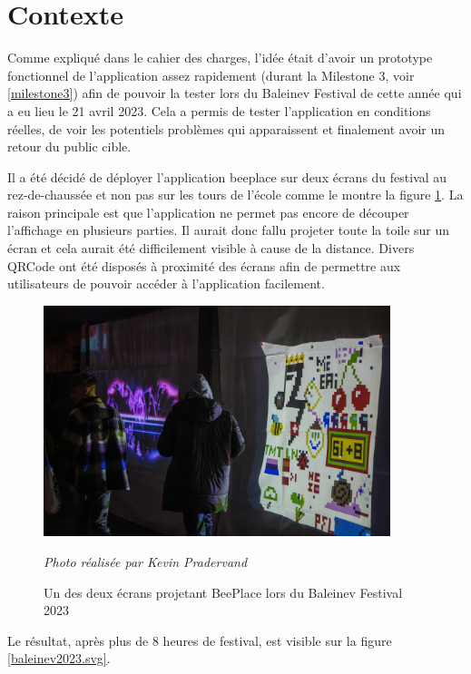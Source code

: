 \section{Contexte}

Comme expliqué dans le cahier des charges, l'idée était d'avoir un prototype fonctionnel de l'application assez rapidement (durant la Milestone 3, voir \ref{milestone3}) afin de pouvoir la tester lors du Baleinev Festival de cette année qui a eu lieu le 21 avril 2023. Cela a permis de tester l'application en conditions réelles, de voir les potentiels problèmes qui apparaissent et finalement avoir un retour du public cible.

Il a été décidé de déployer l'application \gls{beeplace} sur deux écrans du festival au rez-de-chaussée et non pas sur les tours de l'école comme le montre la figure \ref{fig:beeplace-baleinev-2023}. La raison principale est que l'application ne permet pas encore de découper l'affichage en plusieurs parties. Il aurait donc fallu projeter toute la toile sur un écran et cela aurait été difficilement visible à cause de la distance. Divers QRCode ont été disposés à proximité des écrans afin de permettre aux utilisateurs de pouvoir accéder à l'application facilement.

\begin{figure}[H]
  \centering
  \includegraphics[width=0.9\textwidth]{assets/figures/beeplace-baleinev-2023.jpg}
  \begin{center}
    \textit{Photo réalisée par Kevin Pradervand}
  \end{center}
  \caption{Un des deux écrans projetant BeePlace lors du Baleinev Festival 2023}
  \label{fig:beeplace-baleinev-2023}
\end{figure}

Le résultat, après plus de 8 heures de festival, est visible sur la figure \ref{baleinev2023.svg}.

